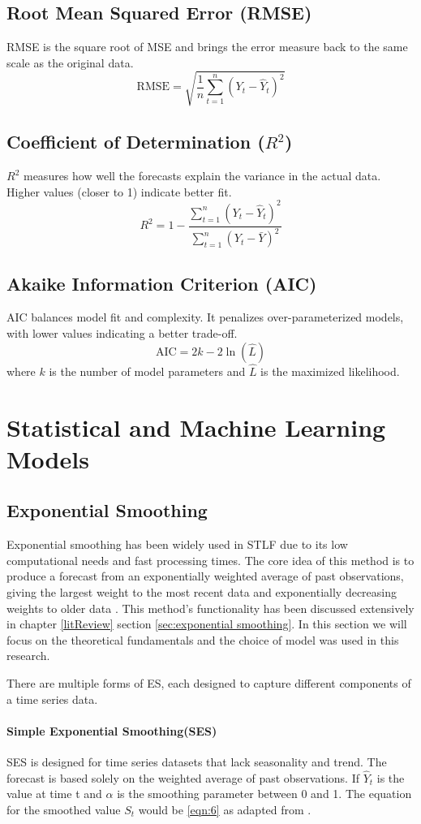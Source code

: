 \subsection{Root Mean Squared Error (RMSE)} 
RMSE is the square root of MSE and brings the error measure back to the same scale as the original data.  
\[
\text{RMSE} = \sqrt{\frac{1}{n}\sum_{t=1}^{n} (Y_t - \hat{Y}_t)^2}
\]

\subsection{Coefficient of Determination ($R^2$)} 
$R^2$ measures how well the forecasts explain the variance in the actual data. Higher values (closer to 1) indicate better fit.  
\[
R^2 = 1 - \frac{\sum_{t=1}^{n} (Y_t - \hat{Y}_t)^2}{\sum_{t=1}^{n} (Y_t - \bar{Y})^2}
\]

\subsection{Akaike Information Criterion (AIC)} 
AIC balances model fit and complexity. It penalizes over-parameterized models, with lower values indicating a better trade-off.  
\[
\text{AIC} = 2k - 2\ln(\hat{L})
\]
where $k$ is the number of model parameters and $\hat{L}$ is the maximized likelihood.



\section{Statistical and Machine Learning Models}
\subsection{Exponential Smoothing}
Exponential smoothing has been widely used in STLF due to its low computational needs and fast processing times. The core idea of this method is to produce a forecast from an exponentially weighted average of past observations, giving the largest weight to the most recent data and exponentially decreasing weights to older data \cite{ostertagova2011simple}. This method's functionality has been discussed extensively in chapter \ref{litReview} section \ref{sec:exponential smoothing}. In this section we will focus on the theoretical fundamentals and the choice of model was used in this research.  

There are multiple forms of ES, each designed to capture different components of a time series data.
\paragraph{Simple Exponential Smoothing(SES)}\label{par:ses}
SES is designed for time series datasets that lack seasonality and trend. The forecast is based solely on the weighted average of past observations. If $\hat{Y}_{t}$  is the value at time t  and $\alpha$ is the smoothing parameter between 0 and 1. The equation for the smoothed value $S_{t}$ would be \ref{eqn:6} as adapted from \cite{ostertagova2011simple}.

